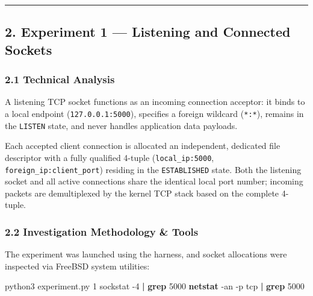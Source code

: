 \documentclass[
]{article}
\newenvironment{Shaded}{\begin{snugshade}}{\end{snugshade}}
\newcommand{\AttributeTok}[1]{\textcolor[rgb]{0.13,0.29,0.53}{#1}}
\newcommand{\ExtensionTok}[1]{#1}
\newcommand{\FunctionTok}[1]{\textcolor[rgb]{0.13,0.29,0.53}{\textbf{#1}}}
\newcommand{\KeywordTok}[1]{\textcolor[rgb]{0.13,0.29,0.53}{\textbf{#1}}}
\newcommand{\NormalTok}[1]{#1}
\begin{document}
\begin{center}\rule{0.5\linewidth}{0.5pt}\end{center}

\hypertarget{experiment-1-listening-and-connected-sockets}{%
\subsection{2. Experiment 1 --- Listening and Connected
Sockets}\label{experiment-1-listening-and-connected-sockets}}

\hypertarget{technical-analysis}{%
\subsubsection{2.1 Technical Analysis}\label{technical-analysis}}

A listening TCP socket functions as an incoming connection acceptor: it
binds to a local endpoint (\texttt{127.0.0.1:5000}), specifies a foreign
wildcard (\texttt{*:*}), remains in the \texttt{LISTEN} state, and never
handles application data payloads.

Each accepted client connection is allocated an independent, dedicated
file descriptor with a fully qualified 4-tuple (\texttt{local\_ip:5000},
\texttt{foreign\_ip:client\_port}) residing in the \texttt{ESTABLISHED}
state. Both the listening socket and all active connections share the
identical local port number; incoming packets are demultiplexed by the
kernel TCP stack based on the complete 4-tuple.

\hypertarget{investigation-methodology-tools}{%
\subsubsection{2.2 Investigation Methodology \&
Tools}\label{investigation-methodology-tools}}

The experiment was launched using the harness, and socket allocations
were inspected via FreeBSD system utilities:

\begin{Shaded}
\begin{Highlighting}[]
\ExtensionTok{python3}\NormalTok{ experiment.py 1}
\ExtensionTok{sockstat} \AttributeTok{{-}4} \KeywordTok{|} \FunctionTok{grep}\NormalTok{ 5000}
\FunctionTok{netstat} \AttributeTok{{-}an} \AttributeTok{{-}p}\NormalTok{ tcp }\KeywordTok{|} \FunctionTok{grep}\NormalTok{ 5000}
\end{Highlighting}
\end{Shaded}
\end{document}
